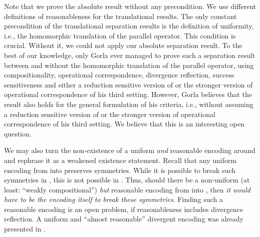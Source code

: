 \documentclass[11pt,techReport]{eptcs}
\begin{document}
Note that we prove the absolute result without any precondition.  We use different definitions of reasonableness for the translational results. The only constant precondition of the translational separation results is the definition of uniformity, i.e., the homomorphic translation of the parallel operator. This condition is crucial. Without it, we could not apply our absolute separation result. To the best of our knowledge, only Gorla ever managed to prove such a separation result between \pimix and \pisep without the homomorphic translation of the parallel operator, using compositionality, operational correspondence, divergence reflection, success sensitiveness and either a reduction sensitive version of  or the stronger version of operational correspondence of his third setting.  However, Gorla believes that the result also holds for the general formulation of his criteria, i.e., without assuming a reduction sensitive version of  or the stronger version of operational correspondence of his third setting. We believe that this is an interesting open question.







We may also turn the non-existence of a uniform \emph{and} reasonable encoding around and rephrase it as a weakened existence statement.  Recall that any uniform encoding from \pimix into \pisep preserves symmetries.  While it is possible to break such symmetries in \pimix, this is not possible in \pisep.  Thus, should there be a non-uniform (at least: ``weakly compositional'') \emph{but} reasonable encoding from \pimix into \pisep, then \emph{it would have to be the encoding itself to break these symmetries}.  Finding such a reasonable encoding is an open problem, if reasonableness includes divergence reflection.  A uniform and ``almost reasonable'' divergent encoding was already presented in \cite{nestmann00}.




\end{document}

